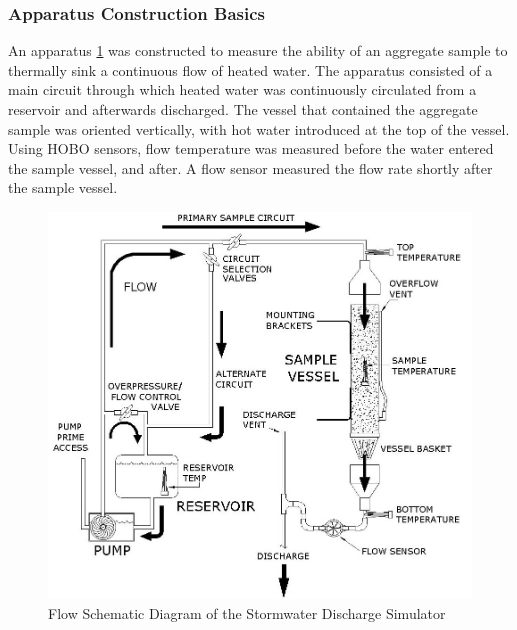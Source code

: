 \subsubsection*{Apparatus Construction Basics}
An apparatus \ref{discharger} was constructed to measure the ability of an aggregate sample to thermally sink a continuous flow of heated water. The apparatus consisted of a main circuit through which heated water was continuously circulated from a reservoir and afterwards discharged. The vessel that contained the aggregate sample was oriented vertically, with hot water introduced at the top of the vessel. Using HOBO sensors, flow temperature was measured before the water entered the sample vessel, and after. A flow sensor measured the flow rate shortly after the sample vessel. 
\begin{center}
\begin{figure}
\label{discharger}
\noindent
\includegraphics[scale=0.5]{DISCHARGER.jpg}
\caption{Flow Schematic Diagram of the Stormwater Discharge Simulator}
\end{figure}


\end{center}

